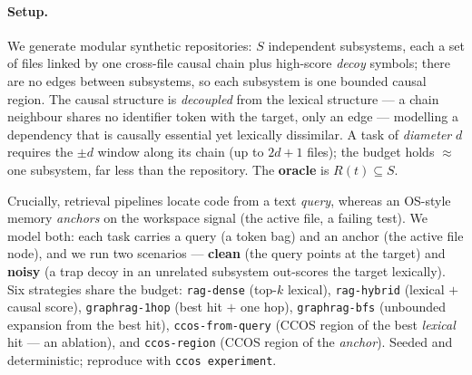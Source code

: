 \documentclass[11pt]{article}
\newcommand{\code}[1]{\texttt{#1}}
\begin{document}
\paragraph{Setup.} We generate modular synthetic repositories: $S$ independent
subsystems, each a set of files linked by one cross-file causal chain plus
high-score \emph{decoy} symbols; there are no edges between subsystems, so each
subsystem is one bounded causal region. The causal structure is \emph{decoupled}
from the lexical structure --- a chain neighbour shares no identifier token with
the target, only an edge --- modelling a dependency that is causally essential yet
lexically dissimilar. A task of \emph{diameter} $d$ requires the $\pm d$ window
along its chain (up to $2d{+}1$ files); the budget holds $\approx$ one subsystem,
far less than the repository. The \textbf{oracle} is $R(t)\subseteq S$.

Crucially, retrieval pipelines locate code from a text \emph{query}, whereas an
OS-style memory \emph{anchors} on the workspace signal (the active file, a failing
test). We model both: each task carries a query (a token bag) and an anchor (the
active file node), and we run two scenarios --- \textbf{clean} (the query points
at the target) and \textbf{noisy} (a trap decoy in an unrelated subsystem
out-scores the target lexically). Six strategies share the budget:
\code{rag-dense} (top-$k$ lexical), \code{rag-hybrid} (lexical $+$ causal score),
\code{graphrag-1hop} (best hit $+$ one hop), \code{graphrag-bfs} (unbounded
expansion from the best hit), \code{ccos-from-query} (CCOS region of the best
\emph{lexical} hit --- an ablation), and \code{ccos-region} (CCOS region of the
\emph{anchor}). Seeded and deterministic; reproduce with \code{ccos experiment}.
\end{document}
